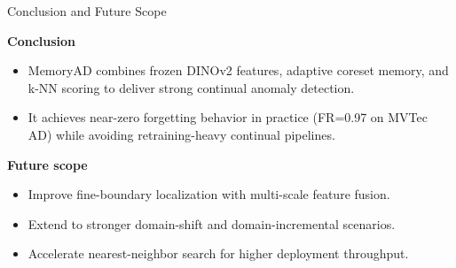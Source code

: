 \documentclass[12pt]{article}
\newlength{\rowthreeheight}
\begin{document}
\begin{posterbox}[height=\rowthreeheight]{Conclusion and Future Scope}
\begin{minipage}[t]{0.49\textwidth}
\textbf{Conclusion}
\begin{itemize}
\item MemoryAD combines frozen DINOv2 features, adaptive coreset memory, and k-NN scoring to deliver strong continual anomaly detection.
\item It achieves near-zero forgetting behavior in practice (FR=0.97 on MVTec AD) while avoiding retraining-heavy continual pipelines.
\end{itemize}
\end{minipage}\hfill
\begin{minipage}[t]{0.49\textwidth}
\textbf{Future scope}
\begin{itemize}
\item Improve fine-boundary localization with multi-scale feature fusion.
\item Extend to stronger domain-shift and domain-incremental scenarios.
\item Accelerate nearest-neighbor search for higher deployment throughput.
\end{itemize}
\end{minipage}
\end{posterbox}
\end{document}
